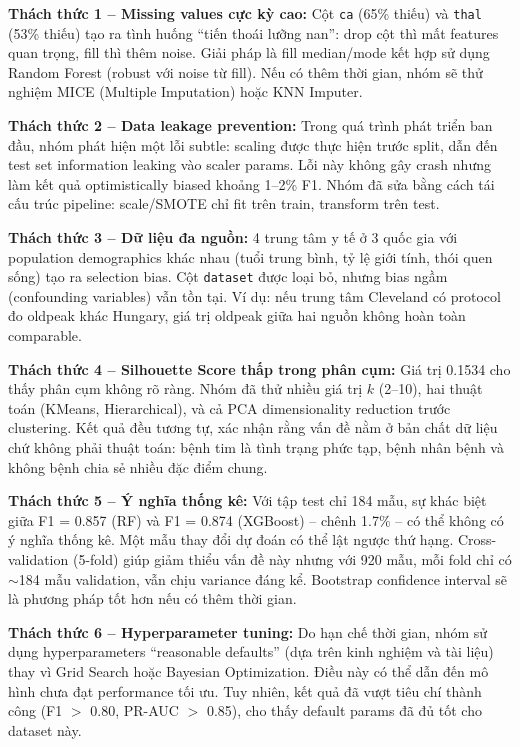 \textbf{Thách thức 1 -- Missing values cực kỳ cao:} Cột \texttt{ca} (65\% thiếu) và \texttt{thal} (53\% thiếu) tạo ra tình huống ``tiến thoái lưỡng nan'': drop cột thì mất features quan trọng, fill thì thêm noise. Giải pháp là fill median/mode kết hợp sử dụng Random Forest (robust với noise từ fill). Nếu có thêm thời gian, nhóm sẽ thử nghiệm MICE (Multiple Imputation) hoặc KNN Imputer.

\textbf{Thách thức 2 -- Data leakage prevention:} Trong quá trình phát triển ban đầu, nhóm phát hiện một lỗi subtle: scaling được thực hiện trước split, dẫn đến test set information leaking vào scaler params. Lỗi này không gây crash nhưng làm kết quả optimistically biased khoảng 1--2\% F1. Nhóm đã sửa bằng cách tái cấu trúc pipeline: scale/SMOTE chỉ fit trên train, transform trên test.

\textbf{Thách thức 3 -- Dữ liệu đa nguồn:} 4 trung tâm y tế ở 3 quốc gia với population demographics khác nhau (tuổi trung bình, tỷ lệ giới tính, thói quen sống) tạo ra selection bias. Cột \texttt{dataset} được loại bỏ, nhưng bias ngầm (confounding variables) vẫn tồn tại. Ví dụ: nếu trung tâm Cleveland có protocol đo oldpeak khác Hungary, giá trị oldpeak giữa hai nguồn không hoàn toàn comparable.

\textbf{Thách thức 4 -- Silhouette Score thấp trong phân cụm:} Giá trị 0.1534 cho thấy phân cụm không rõ ràng. Nhóm đã thử nhiều giá trị $k$ (2--10), hai thuật toán (KMeans, Hierarchical), và cả PCA dimensionality reduction trước clustering. Kết quả đều tương tự, xác nhận rằng vấn đề nằm ở bản chất dữ liệu chứ không phải thuật toán: bệnh tim là tình trạng phức tạp, bệnh nhân bệnh và không bệnh chia sẻ nhiều đặc điểm chung.

\textbf{Thách thức 5 -- Ý nghĩa thống kê:} Với tập test chỉ 184 mẫu, sự khác biệt giữa F1 = 0.857 (RF) và F1 = 0.874 (XGBoost) -- chênh 1.7\% -- có thể không có ý nghĩa thống kê. Một mẫu thay đổi dự đoán có thể lật ngược thứ hạng. Cross-validation (5-fold) giúp giảm thiểu vấn đề này nhưng với 920 mẫu, mỗi fold chỉ có $\sim$184 mẫu validation, vẫn chịu variance đáng kể. Bootstrap confidence interval sẽ là phương pháp tốt hơn nếu có thêm thời gian.

\textbf{Thách thức 6 -- Hyperparameter tuning:} Do hạn chế thời gian, nhóm sử dụng hyperparameters ``reasonable defaults'' (dựa trên kinh nghiệm và tài liệu) thay vì Grid Search hoặc Bayesian Optimization. Điều này có thể dẫn đến mô hình chưa đạt performance tối ưu. Tuy nhiên, kết quả đã vượt tiêu chí thành công (F1 $>$ 0.80, PR-AUC $>$ 0.85), cho thấy default params đã đủ tốt cho dataset này.

